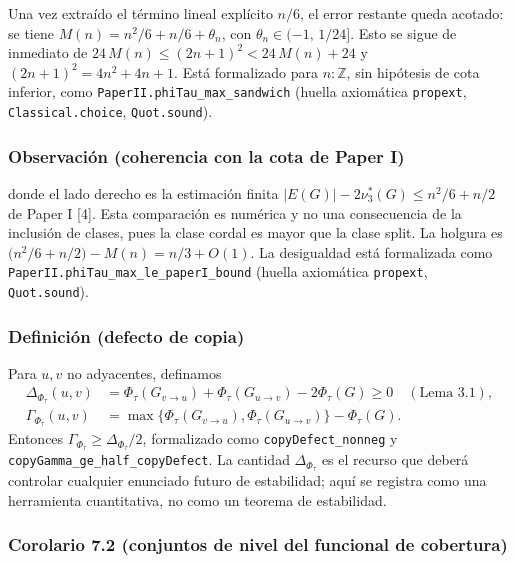 \documentclass[spanish,11pt,a4paper]{article}
\begin{document}
Una vez extraído el término lineal explícito \(n/6\), el error restante
queda acotado: se tiene \(M(n)=n^2/6+n/6+\theta_n\), con
\(\theta_n\in(-1,\,1/24]\). Esto se sigue de inmediato de
\(24\,M(n)\le(2n+1)^2<24\,M(n)+24\) y \((2n+1)^2=4n^2+4n+1\). Está
formalizado para \(n:\mathbb Z\), sin hipótesis de cota inferior, como
\nolinkurl{PaperII.phiTau_max_sandwich} (huella axiomática
\nolinkurl{propext}, \nolinkurl{Classical.choice}, \nolinkurl{Quot.sound}).

\subsubsection{Observación (coherencia con la cota de Paper
I)}\label{observaciuxf3n-coherencia-con-la-cota-de-paper-i}

donde el lado derecho es la estimación finita
\(|E(G)|-2\nu_3^*(G)\le n^2/6+n/2\) de Paper I {[}4{]}. Esta comparación
es numérica y no una consecuencia de la inclusión de clases, pues la
clase cordal es mayor que la clase split. La holgura es
\(\bigl(n^2/6+n/2\bigr)-M(n)=n/3+O(1)\). La desigualdad está formalizada
como \nolinkurl{PaperII.phiTau_max_le_paperI_bound} (huella axiomática
\nolinkurl{propext}, \nolinkurl{Quot.sound}).

\subsubsection{Definición (defecto de
copia)}\label{definiciuxf3n-defecto-de-copia}

Para \(u,v\) no adyacentes, definamos \[
\begin{aligned}
\Delta_{\Phi_\tau}(u,v)
&=\Phi_\tau(G_{v\to u})+\Phi_\tau(G_{u\to v})-2\Phi_\tau(G)\ge0
\quad(\text{Lema 3.1}),\\
\Gamma_{\Phi_\tau}(u,v)
&=\max\{\Phi_\tau(G_{v\to u}),\Phi_\tau(G_{u\to v})\}-\Phi_\tau(G).
\end{aligned}
\] Entonces \(\Gamma_{\Phi_\tau}\ge\Delta_{\Phi_\tau}/2\), formalizado
como \nolinkurl{copyDefect_nonneg} y
\nolinkurl{copyGamma_ge_half_copyDefect}. La cantidad
\(\Delta_{\Phi_\tau}\) es el recurso que deberá controlar cualquier
enunciado futuro de estabilidad; aquí se registra como una herramienta
cuantitativa, no como un teorema de estabilidad.

\subsubsection{Corolario 7.2 (conjuntos de nivel del funcional de
cobertura)}\label{corolario-7.2-conjuntos-de-nivel-del-funcional-de-cobertura}
\end{document}
